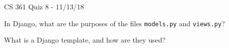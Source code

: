 \documentclass{exam}
\begin{document}
\begin{center}
	CS 361 Quiz 8 - 11/13/18
\end{center}

\vspace{1em}

\begin{center}
\end{center}

\begin{questions}
	
\question[6] In Django, what are the purposes of the files \texttt{models.py} and \texttt{views.py}?

\vfill

\question[4] What is a Django template, and how are they used?

\vfill

\end{questions}
\end{document}

